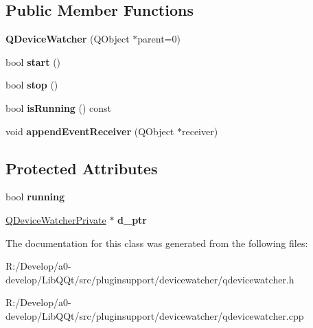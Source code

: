 \subsection*{Public Member Functions}
\begin{DoxyCompactItemize}
\item 
\mbox{\label{class_q_device_watcher_a9d2331c4762570b2840e51f7e5aef8c3}} 
{\bfseries Q\+Device\+Watcher} (Q\+Object $\ast$parent=0)
\item 
\mbox{\label{class_q_device_watcher_a4a4355eb2f509efffde0b34f7da76d2c}} 
bool {\bfseries start} ()
\item 
\mbox{\label{class_q_device_watcher_a842d5c0f66b73b6ace5e8ab1fe11a46c}} 
bool {\bfseries stop} ()
\item 
\mbox{\label{class_q_device_watcher_a1c40ba512af87de1a0e6dec88f18510b}} 
bool {\bfseries is\+Running} () const
\item 
\mbox{\label{class_q_device_watcher_ae7c8cf54edad7353e64f3359a81d8433}} 
void {\bfseries append\+Event\+Receiver} (Q\+Object $\ast$receiver)
\end{DoxyCompactItemize}
\subsection*{Protected Attributes}
\begin{DoxyCompactItemize}
\item 
\mbox{\label{class_q_device_watcher_a4a2dd1b813ce4d537a330eed367fecb0}} 
bool {\bfseries running}
\item 
\mbox{\label{class_q_device_watcher_ae2c251943b00250dfc9d3632a5298af5}} 
\mbox{\hyperlink{class_q_device_watcher_private}{Q\+Device\+Watcher\+Private}} $\ast$ {\bfseries d\+\_\+ptr}
\end{DoxyCompactItemize}


The documentation for this class was generated from the following files\+:\begin{DoxyCompactItemize}
\item 
R\+:/\+Develop/a0-\/develop/\+Lib\+Q\+Qt/src/pluginsupport/devicewatcher/qdevicewatcher.\+h\item 
R\+:/\+Develop/a0-\/develop/\+Lib\+Q\+Qt/src/pluginsupport/devicewatcher/qdevicewatcher.\+cpp\end{DoxyCompactItemize}
